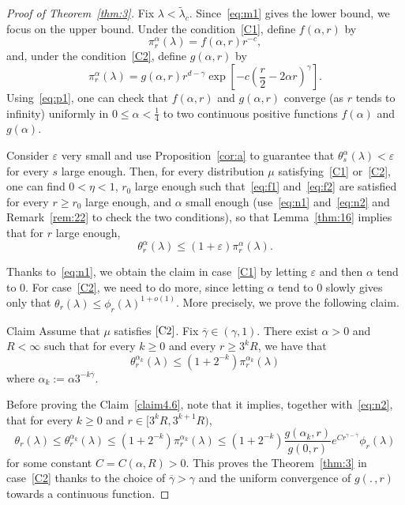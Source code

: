 \documentclass[AHL,Unicode,longabstracts]{cedram}
\newcommand{\ep}{\varepsilon}
\begin{document}
\begin{proof}[Proof of Theorem~\ref{thm:3}]
Fix $\lambda<\widetilde\lambda_c$.
Since~\eqref{eq:m1} gives the lower bound, we focus on the upper bound. Under the condition~\eqref{C1}, define $f(\alpha,r)$ by
\begin{equation}\label{eq:n1}
\pi_r^\alpha(\lambda)=f(\alpha,r) r^{-c},
\end{equation}
and, under the condition~\eqref{C2}, define $g(\alpha,r)$ by
\begin{equation}\label{eq:n2}
\pi_r^\alpha(\lambda)=g(\alpha,r) r^{d-\gamma} \exp\left[-c \left(\frac r 2-{2\alpha} r\right)^\gamma\right]. 
\end{equation}
Using~\eqref{eq:p1}, one can check that $f(\alpha,r)$ and $g(\alpha,r)$ converge (as $r$ tends to infinity) uniformly in $0\le \alpha<\tfrac14$ to two continuous positive functions $f(\alpha)$ and $g(\alpha)$.

Consider $\ep$ very small and use Proposition~\ref{cor:a} to guarantee that $\theta_{s}^\alpha(\lambda)<\ep$ for every $s$ large enough. Then, for every distribution $\mu$ satisfying~\eqref{C1}  or~\eqref{C2}, one can find $0<\eta<1$, $r_0$ large enough such that~\eqref{eq:f1} and~\eqref{eq:f2} are satisfied for every $r\ge r_0$ large enough, and $\alpha$ small enough (use~\eqref{eq:n1} and~\eqref{eq:n2} and Remark~\ref{rem:22} to check the two conditions), so that Lemma~\ref{thm:16} implies that for $r$ large enough,
\begin{equation}
\theta_r^\alpha(\lambda)\le (1+\ep)\pi_r^\alpha(\lambda)\label{eq:bn}
.
\end{equation}

Thanks to~\eqref{eq:n1}, we obtain the claim in case~\eqref{C1} by letting $\ep$ and then $\alpha$ tend to 0. For case~\eqref{C2}, we need to do more, since letting $\alpha$ tend to 0 slowly gives only that $\theta_r(\lambda)\le \phi_r(\lambda)^{1+o(1)}$. More precisely, we prove the following claim.

\begin{enonce}[plain]{Claim}\label{claim4.6}
Assume that $\mu$ satisfies $\eqref{C2}$. Fix $\overline \gamma\in(\gamma,1)$. There exist $\alpha>0$ and $R<\infty$ such that for every $k\ge0$ and every $r\ge 3^kR$, we have that
\begin{equation}\label{eq:b2}
\theta_{r}^{\alpha_k}(\lambda)\le (1+2^{-k})\pi_r^{\alpha_k}(\lambda)
\end{equation}
where $\alpha_k:= \alpha 3^{-k \overline\gamma}$.
\end{enonce}


Before proving the Claim~\ref{claim4.6}, note that it implies, together with~\eqref{eq:n2}, that for every $k\ge0$ and $r\in [3^k R,3^{k+1}R)$,
\[
\theta_r(\lambda)\le\theta_{r}^{\alpha_k}(\lambda)\le (1+2^{-k})\pi_r^{\alpha_k}(\lambda)\le (1+2^{-k}) \frac{g(\alpha_k,r)}{g(0,r)}e^{Cr^{\gamma-\overline\gamma}} \phi_r(\lambda)
\]
for some constant $C=C(\alpha,R)>0$. This proves the Theorem~\ref{thm:3} in case~\eqref{C2} thanks to the choice of $\overline\gamma>\gamma$ and the uniform convergence of $g(.\,,r)$ towards a continuous function.
\end{proof}
\end{document}
